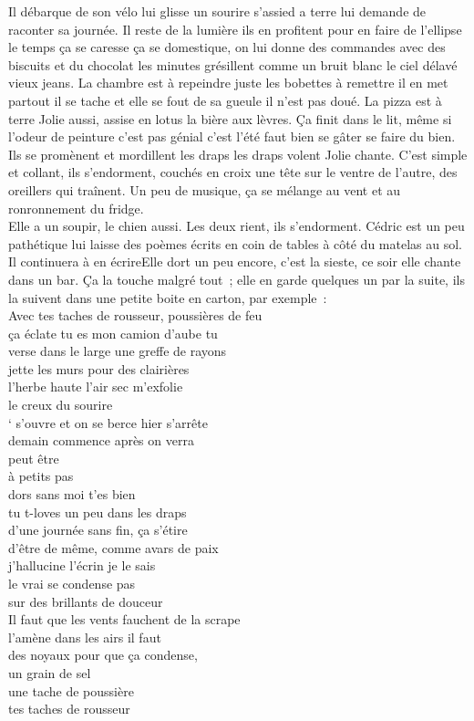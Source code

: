 \documentclass{article}
\begin{document}
Il débarque de son vélo lui glisse un sourire s’assied a terre lui
demande de raconter sa journée. Il reste de la lumière ils en
profitent pour en faire de l’ellipse le temps ça se caresse ça se
domestique, on lui donne des commandes avec des biscuits et du
chocolat les minutes grésillent comme un bruit blanc le ciel délavé
vieux jeans. La chambre est à repeindre juste les bobettes à remettre
il en met partout il se tache et elle se fout de sa gueule il n’est
pas doué. La pizza est à terre Jolie aussi, assise en lotus la bière
aux lèvres.  Ça finit dans le lit, même si l’odeur de peinture c’est
pas génial c’est l’été faut bien se gâter se faire du bien. Ils se
promènent et mordillent les draps les draps volent Jolie chante. C’est
simple et collant, ils s’endorment, couchés en croix une tête sur le
ventre de l’autre, des oreillers qui traînent. Un peu de musique, ça
se mélange au vent et au ronronnement du fridge.\\

Elle a un soupir, le chien aussi. Les deux rient, ils s’endorment.
\clearpage
Cédric est un peu pathétique lui laisse des poèmes écrits en coin de
tables à côté du matelas au sol. Il continuera à en écrireElle dort un peu encore, c’est la
sieste, ce soir elle chante dans un bar. Ça la touche malgré tout ;
elle en garde quelques un par la suite, ils la suivent dans une petite
boite en carton, par exemple :\\

Avec tes taches de rousseur, poussières de feu\\
ça éclate tu es mon camion d’aube tu\\
verse dans le large une greffe de rayons\\
jette les murs pour des clairières\\
l’herbe haute l’air sec m’exfolie\\
le creux du sourire\\
‘ s’ouvre et on se berce hier s’arrête\\
demain commence après on verra\\
peut être\\
à petits pas\\
dors sans moi t’es bien\\
tu t-loves un peu dans les draps\\


d’une journée sans fin, ça s’étire \\
d’être de même, comme avars de paix \\
j’hallucine l’écrin je le sais\\
le vrai se condense pas\\
sur des brillants de douceur\\
Il faut que les vents fauchent de la scrape\\
l’amène dans les airs il faut\\
des noyaux pour que ça condense,\\
un grain de sel\\
une tache de poussière\\
tes taches de rousseur\\
\clearpage
\end{document}
